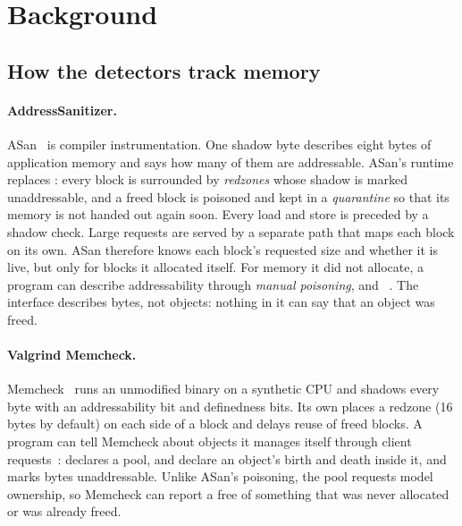 \section{Background}
\label{sec:background}

\subsection{How the detectors track memory}

\paragraph{AddressSanitizer.} ASan~\cite{serebryany2012asan} is compiler instrumentation. One shadow byte describes eight bytes of application memory and says how many of them are addressable. ASan's runtime replaces : every block is surrounded by \emph{redzones} whose shadow is marked unaddressable, and a freed block is poisoned and kept in a \emph{quarantine} so that its memory is not handed out again soon. Every load and store is preceded by a shadow check. Large requests are served by a separate path that maps each block on its own. ASan therefore knows each block's requested size and whether it is live, but only for blocks it allocated itself. For memory it did not allocate, a program can describe addressability through \emph{manual poisoning},  and ~\cite{asanpoison}. The interface describes bytes, not objects: nothing in it can say that an object was freed.

\paragraph{Valgrind Memcheck.} Memcheck~\cite{nethercote2007valgrind} runs an unmodified binary on a synthetic CPU and shadows every byte with an addressability bit and definedness bits. Its own  places a redzone (16 bytes by default) on each side of a block and delays reuse of freed blocks. A program can tell Memcheck about objects it manages itself through client requests~\cite{valgrindmanual}:  declares a pool,  and  declare an object's birth and death inside it, and  marks bytes unaddressable. Unlike ASan's poisoning, the pool requests model ownership, so Memcheck can report a free of something that was never allocated or was already freed.

